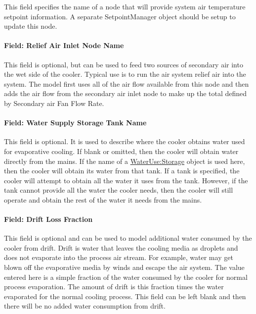 This field specifies the name of a node that will provide system air temperature setpoint information. A separate SetpointManager object should be setup to update this node.

\paragraph{Field: Relief Air Inlet Node Name}\label{field-relief-air-inlet-node-name}

This field is optional, but can be used to feed two sources of secondary air into the wet side of the cooler. Typical use is to run the air system relief air into the system. The model first uses all of the air flow available from this node and then adds the air flow from the secondary air inlet node to make up the total defined by Secondary air Fan Flow Rate.

\paragraph{Field: Water Supply Storage Tank Name}\label{field-water-supply-storage-tank-name-4}

This field is optional. It is used to describe where the cooler obtains water used for evaporative cooling. If blank or omitted, then the cooler will obtain water directly from the mains. If the name of a \hyperref[waterusestorage]{WaterUse:Storage} object is used here, then the cooler will obtain its water from that tank. If a tank is specified, the cooler will attempt to obtain all the water it uses from the tank. However, if the tank cannot provide all the water the cooler needs, then the cooler will still operate and obtain the rest of the water it needs from the mains.

\paragraph{Field: Drift Loss Fraction}\label{field-drift-loss-fraction-2}

This field is optional and can be used to model additional water consumed by the cooler from drift. Drift is water that leaves the cooling media as droplets and does not evaporate into the process air stream. For example, water may get blown off the evaporative media by winds and escape the air system. The value entered here is a simple fraction of the water consumed by the cooler for normal process evaporation. The amount of drift is this fraction times the water evaporated for the normal cooling process. This field can be left blank and then there will be no added water consumption from drift.

